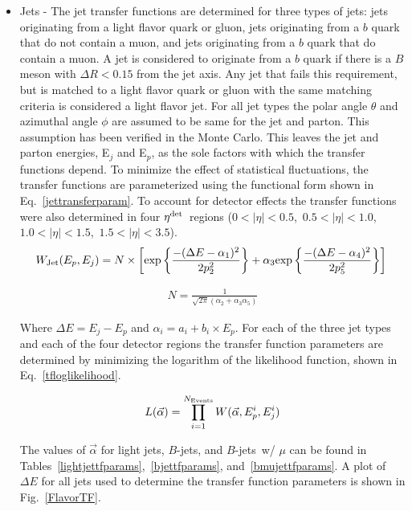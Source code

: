 \begin{itemize}
\begin{itemize}
\item Jets - The jet transfer functions are determined for three types of jets: jets originating from a light flavor quark or gluon, jets originating from a $b$ quark that do not contain a muon, and jets originating from a $b$ quark that do contain a muon. A jet is considered to originate from a $b$ quark if there is a $B$ meson with $\Delta R<0.15$ from the jet axis. Any jet that fails this requirement, but is matched to a light flavor quark or gluon with the same matching criteria is considered a light flavor jet. For all jet types the polar angle $\theta$ and azimuthal angle $\phi$ are assumed to be same for the jet and parton. This assumption has been verified in the Monte Carlo. This leaves the jet and parton energies, E$_{j}$ and E$_{p}$, as the sole factors with which the transfer functions depend. To minimize the effect of statistical fluctuations, the transfer functions are parameterized using the functional form shown in Eq.~\ref{jettransferparam}. To account for detector effects the transfer functions were also determined in four $\eta^{\rm{det}}$~regions ($0<|\eta|<0.5$,~$0.5<|\eta|<1.0$,~$1.0<|\eta|<1.5$,~$1.5<|\eta|<3.5$).
\begin{equation}
\label{jettransferparam}
W_{\rm{Jet}}(E_{p},E_{j}) = N \times \left[ \mathrm{exp}\left\{\frac{-(\Delta E-\alpha_{1})^{2}}{2p^{2}_{2}}\right\} + \alpha_{3}\mathrm{exp} \left\{\frac{-(\Delta E-\alpha_{4})^{2}}{2p^{2}_{5}} \right\}		\right] \\
\end{equation}

\begin{eqnarray}
\nonumber
N = \frac{1}{\sqrt{2\pi}(\alpha_{2} + \alpha_{3}\alpha_{5})}
\end{eqnarray}

\noindent Where $\Delta E=E_{j}-E_{p}$ and $\alpha_{i} = a_{i}+b_{i} \times E_{p}$. For each of the three jet types and each of the four detector regions the transfer function parameters are determined by minimizing the logarithm of the likelihood function, shown in Eq.~\ref{tfloglikelihood}.

\begin{equation}
\label{tfloglikelihood}
L(\vec{\alpha}) = \prod_{i=1}^{N_{\rm{Events}}}W(\vec{\alpha}, E_{p}^{i}, E_{j}^{i})
\end{equation}

The values of $\vec{\alpha}$ for light jets, $B$-jets, and $B$-jets~w/ $\mu$ can be found in Tables~\ref{lightjettfparams},~\ref{bjettfparams}, and~\ref{bmujettfparams}. A plot of $\Delta E$ for all jets used to determine the transfer function parameters is shown in Fig.~\ref{FlavorTF}.


\end{itemize}
\end{itemize}
